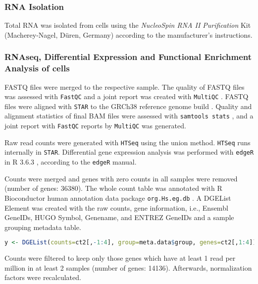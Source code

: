 \subsubsection*{RNA Isolation}
Total RNA was isolated from \INA cells using the \textit{NucleoSpin RNA II
    Purification} Kit (Macherey-Nagel, Düren, Germany) according to the
manufacturer’s instructions.




\subsubsection*{RNAseq, Differential Expression and Functional Enrichment Analysis of \INA cells}
FASTQ files were merged to the respective sample. The quality of FASTQ files was
assessed with \texttt{FastQC} \cite{Andrews:2010tn} and a joint report was
created with \texttt{MultiQC} \cite{ewelsMultiQCSummarizeAnalysis2016}. FASTQ
files were aligned with \texttt{STAR} \cite{dobinSTARUltrafastUniversal2013} to
the GRCh38 reference genome build \cite{zerbinoEnsembl20182018}. Quality and
alignment statistics of final BAM files were assessed with \texttt{samtools
    stats} \cite{liSequenceAlignmentMap2009}, and a joint report with
\texttt{FastQC} reports by \texttt{MultiQC} was generated.

Raw read counts were generated with \texttt{HTSeq}
\cite{andersHTSeqPythonFramework2015} using the union method. \texttt{HTSeq}
runs internally in \texttt{STAR}. Differential gene expression analysis was
performed with \texttt{edgeR} \cite{Robinson:2010:Bioinformatics:19910308} in R
3.6.3 \cite{rcoreteamLanguageEnvironmentStatistical2018}, according to the \texttt{edgeR} manual.

Counts were merged and genes with zero counts in all samples were removed
(number of genes: 36380). The whole count table was annotated with R
Bioconductor \cite{gentlemanBioconductorBiocViews} human annotation data package
\texttt{org.Hs.eg.db} \cite{carlsonOrgHsEg2016}. A DGEList Element was created
with the raw counts, gene information, i.e., Ensembl GeneIDs, HUGO Symbol,
Genename, and ENTREZ GeneIDs and a sample grouping metadata table.

\begin{lstlisting}[language=R,style=defaultstyle]
y <- DGEList(counts=ct2[,-1:4], group=meta.data$group, genes=ct2[,1:4])
\end{lstlisting}

Counts were filtered to keep only those genes which have at least 1 read per
million in at least 2 samples (number of genes: 14136). Afterwards,
normalization factors were recalculated.


